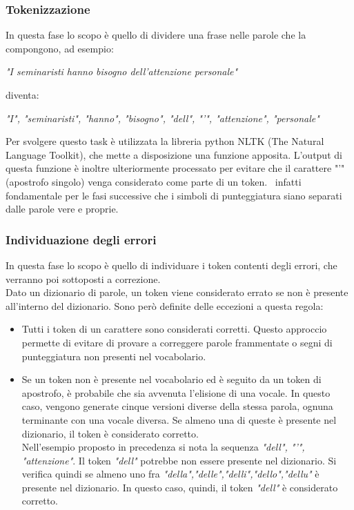 \documentclass[12pt]{article}
\begin{document}
\subsubsection{Tokenizzazione}
In questa fase lo scopo è quello di dividere una frase nelle parole che la compongono, ad esempio:
\begin{center}
\textit{"I seminaristi hanno bisogno dell'attenzione personale"}
\end{center}
diventa:
\begin{center}
\textit{"I", "seminaristi", "hanno", "bisogno", "dell", "'", "attenzione", "personale"}
\end{center}
Per svolgere questo task è utilizzata la libreria python NLTK\cite{nltk} (The Natural Language Toolkit), che mette a disposizione una funzione apposita. L'output di questa funzione è inoltre ulteriormente processato per evitare che il carattere "'" (apostrofo singolo) venga considerato come parte di un token. \E\ infatti fondamentale per le fasi successive che i simboli di punteggiatura siano separati dalle parole vere e proprie.

\subsubsection{Individuazione degli errori}
In questa fase lo scopo è quello di individuare i token contenti degli errori, che verranno poi sottoposti a correzione.\\
Dato un dizionario di parole, un token viene considerato errato se non è presente all'interno del dizionario. Sono però definite delle eccezioni a questa regola:
\begin{itemize}
\item Tutti i token di un carattere sono considerati corretti. Questo approccio permette di evitare di provare a correggere parole frammentate o segni di punteggiatura non presenti nel vocabolario.
\item Se un token non è presente nel vocabolario ed è seguito da un token di apostrofo, è probabile che sia avvenuta l'elisione di una vocale. In questo caso, vengono generate cinque versioni diverse della stessa parola, ognuna terminante con una vocale diversa. Se almeno una di queste è presente nel dizionario, il token è considerato corretto.\\
Nell'esempio proposto in precedenza si nota la sequenza \textit{"dell", "'", "attenzione"}. Il token \textit{"dell"} potrebbe non essere presente nel dizionario. Si verifica quindi se almeno uno fra \textit{"della","delle","delli","dello","dellu"} è presente nel dizionario. In questo caso, quindi, il token \textit{"dell"} è considerato corretto.
\end{itemize}
\end{document}

